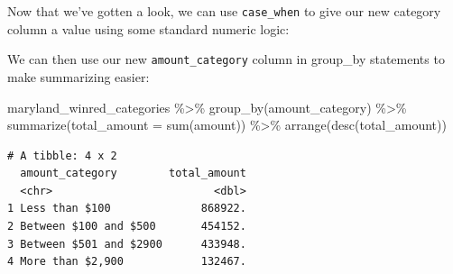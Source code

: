\documentclass[
  letterpaper,
  DIV=11,
  numbers=noendperiod]{scrreprt}
\newenvironment{Shaded}{\begin{snugshade}}{\end{snugshade}}
\newcommand{\AttributeTok}[1]{\textcolor[rgb]{0.40,0.45,0.13}{#1}}
\newcommand{\DecValTok}[1]{\textcolor[rgb]{0.68,0.00,0.00}{#1}}
\newcommand{\FunctionTok}[1]{\textcolor[rgb]{0.28,0.35,0.67}{#1}}
\newcommand{\NormalTok}[1]{\textcolor[rgb]{0.00,0.23,0.31}{#1}}
\newcommand{\OtherTok}[1]{\textcolor[rgb]{0.00,0.23,0.31}{#1}}
\newcommand{\SpecialCharTok}[1]{\textcolor[rgb]{0.37,0.37,0.37}{#1}}
\newcommand{\StringTok}[1]{\textcolor[rgb]{0.13,0.47,0.30}{#1}}
\begin{document}
Now that we've gotten a look, we can use \texttt{case\_when} to give our
new category column a value using some standard numeric logic:

\begin{Shaded}
\end{Shaded}

We can then use our new \texttt{amount\_category} column in group\_by
statements to make summarizing easier:

\begin{Shaded}
\begin{Highlighting}[]
\NormalTok{maryland\_winred\_categories }\SpecialCharTok{\%\textgreater{}\%}
  \FunctionTok{group\_by}\NormalTok{(amount\_category) }\SpecialCharTok{\%\textgreater{}\%}
  \FunctionTok{summarize}\NormalTok{(}\AttributeTok{total\_amount =} \FunctionTok{sum}\NormalTok{(amount)) }\SpecialCharTok{\%\textgreater{}\%}
  \FunctionTok{arrange}\NormalTok{(}\FunctionTok{desc}\NormalTok{(total\_amount))}
\end{Highlighting}
\end{Shaded}

\begin{verbatim}
# A tibble: 4 x 2
  amount_category        total_amount
  <chr>                         <dbl>
1 Less than $100              868922.
2 Between $100 and $500       454152.
3 Between $501 and $2900      433948.
4 More than $2,900            132467.
\end{verbatim}
\end{document}
